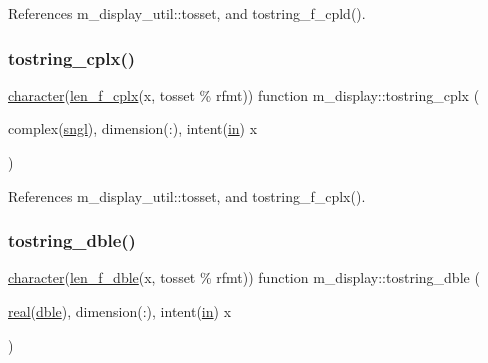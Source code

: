 References m\+\_\+display\+\_\+util\+::tosset, and tostring\+\_\+f\+\_\+cpld().

\mbox{\label{namespacem__display_a1b05d11dd12d88ce00f912751be126f3}} 
\subsubsection{\texorpdfstring{tostring\+\_\+cplx()}{tostring\_cplx()}}
{\footnotesize\ttfamily \hyperlink{option__stopwatch_83_8txt_abd4b21fbbd175834027b5224bfe97e66}{character}(\hyperlink{namespacem__display_a37f268a7276f14d4975200a8f83acff3}{len\+\_\+f\+\_\+cplx}(x, tosset \% rfmt)) function m\+\_\+display\+::tostring\+\_\+cplx (\begin{DoxyParamCaption}\item[{complex(\hyperlink{namespacem__display_a2ac86bc535c3ccc5947dbb3109c666b5}{sngl}), dimension(\+:), intent(\hyperlink{M__journal_83_8txt_afce72651d1eed785a2132bee863b2f38}{in})}]{x }\end{DoxyParamCaption})\hspace{0.3cm}{\ttfamily [private]}}



References m\+\_\+display\+\_\+util\+::tosset, and tostring\+\_\+f\+\_\+cplx().

\mbox{\label{namespacem__display_a0b5ebf70cd08a5bffc132707049bcef6}} 
\subsubsection{\texorpdfstring{tostring\+\_\+dble()}{tostring\_dble()}}
{\footnotesize\ttfamily \hyperlink{option__stopwatch_83_8txt_abd4b21fbbd175834027b5224bfe97e66}{character}(\hyperlink{namespacem__display_aa013a639d5b0f7e40b627c9d712693f0}{len\+\_\+f\+\_\+dble}(x, tosset \% rfmt)) function m\+\_\+display\+::tostring\+\_\+dble (\begin{DoxyParamCaption}\item[{\hyperlink{read__watch_83_8txt_abdb62bde002f38ef75f810d3a905a823}{real}(\hyperlink{namespacem__display_a46d90b75b6ccef7ccade133e5847e815}{dble}), dimension(\+:), intent(\hyperlink{M__journal_83_8txt_afce72651d1eed785a2132bee863b2f38}{in})}]{x }\end{DoxyParamCaption})\hspace{0.3cm}{\ttfamily [private]}}



